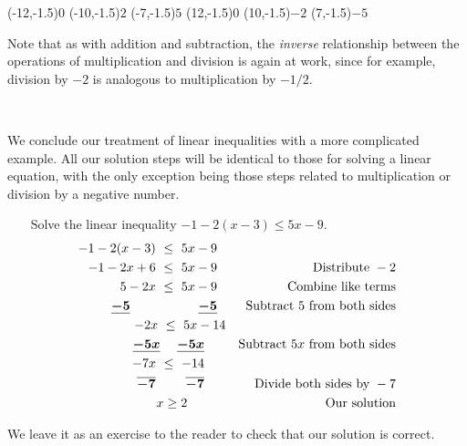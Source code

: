 \begin{center}
\begin{mfpic}[8]{-20}{20}{-2}{4}
\arrow\reverse\arrow{}
\tlpointsep{4pt}
\tlabel[cc](-12,-1.5){$0$}
\tlabel[cc](-10,-1.5){$2$}
\tlabel[cc](-7,-1.5){$5$}
\arrow{}
\arrow\reverse\arrow{}
\tlabel[cc](12,-1.5){$0$}
\tlabel[cc](10,-1.5){$-2$}
\tlabel[cc](7,-1.5){$-5$}
\end{mfpic} 
\end{center}

Note that as with addition and subtraction, the \textit{inverse} relationship between the operations of multiplication and division is again at work, since for example, division by $-2$ is analogous to multiplication by $-1/2$.\par
~\par
We conclude our treatment of linear inequalities with a more complicated example.  All our solution steps will be identical to those for solving a linear equation, with the only exception being those steps related to multiplication or division by a negative number.\par

\begin{example}\label{Lin96}~~~ Solve the linear inequality  $-1-2(x-3)\leq 5x-9$. 
\begin{eqnarray*}
-1-2(x-3)~\leq~ 5x-9~~ && \\
-1-2x+6~\leq~ 5x-9~~ && \text{Distribute~} -2\\
5-2x~\leq~ 5x-9~~ && \text{Combine~like~terms}\\
\boldsymbol{\underline{-5}~~~~~~~~~~~~~~~~\underline{-5}}~~ &&  \text{Subtract~} 5 \text{~from~both~sides}\\
-2x~\leq~ 5x-14 && \\
\boldsymbol{\underline{-5x}~~~~\underline{-5x}}~~~~~ && \text{Subtract~} 5x \text{~from~both~sides} \\
-7x~\leq~ -14~~~~~ && \\
\boldsymbol{\overline{-7}~~~~~~~\overline{-7}}~~~~~&& \text{Divide~both~sides~by~} -7\\
x\geq 2~~~~~~~~~ && \text{Our~solution}
\end{eqnarray*}
\end{example}


We leave it as an exercise to the reader to check that our solution is correct. 
